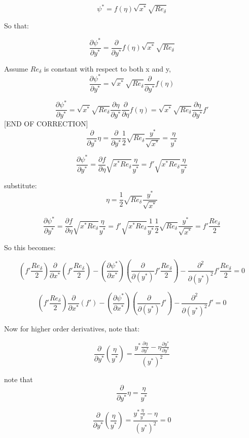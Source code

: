 \documentclass[11pt]{article}
\begin{document}
$$\psi^* = f(\eta) \sqrt{x^*} \sqrt{Re_\delta}$$

So that:

$$\frac{\partial \psi^* }{\partial y^*} =\frac{\partial}{\partial y^*} f(\eta) \sqrt{x^*} \sqrt{Re_\delta} $$

Assume $Re_\delta$ is constant with respect to both x and y,
$$\frac{\partial \psi^* }{\partial y^*} = \sqrt{x^*} \sqrt{Re_\delta} \frac{\partial}{\partial y^*} f(\eta)  $$


$$\frac{\partial \psi^* }{\partial y^*} = \sqrt{x^*} \sqrt{Re_\delta} \frac{\partial \eta}{\partial y^*} \frac{\partial}{\partial \eta} f(\eta) = \sqrt{x^*} \sqrt{Re_\delta} \frac{\partial \eta}{\partial y^*} f' $$
[END OF CORRECTION]
$$\frac{\partial}{\partial y^*} \eta =  \frac{\partial}{\partial y^*} \frac{1}{2} \sqrt{Re_\delta} \frac{y^*}{\sqrt{x^*}} = \frac{\eta}{y^*}$$

$$ \frac{\partial \psi^* }{\partial y^*} = \frac{\partial f}{\partial \eta} \sqrt{x^* Re_\delta}  \frac{\eta}{y^*} = f' \sqrt{x^* Re_\delta}  \frac{\eta}{y^*}$$


substitute:
$$\eta = \frac{1}{2} \sqrt{Re_\delta} \frac{y^*}{\sqrt{x^*}}  $$

$$ \frac{\partial \psi^* }{\partial y^*} = \frac{\partial f}{\partial \eta} \sqrt{x^* Re_\delta}  \frac{\eta}{y^*} = f' \sqrt{x^* Re_\delta}  \frac{1}{y^*} \frac{1}{2} \sqrt{Re_\delta} \frac{y^*}{\sqrt{x^*}} = f' \frac{Re_\delta}{2}$$

So this becomes:

$$  (f' \frac{Re_\delta}{2})  \frac{\partial}{\partial x^* } (f' \frac{Re_\delta}{2}) - (\frac{\partial \psi^*}{\partial x^*})  (\frac{\partial }{\partial (y^*)} f' \frac{Re_\delta}{2}) - \frac{\partial^2}{\partial (y^*)^2} f' \frac{Re_\delta}{2}  =  0$$

$$  (f' \frac{Re_\delta}{2})  \frac{\partial}{\partial x^* } (f' ) - (\frac{\partial \psi^*}{\partial x^*})  (\frac{\partial }{\partial (y^*)} f' ) - \frac{\partial^2}{\partial (y^*)^2} f'  =  0$$



Now for higher order derivatives, note that:

$$\frac{\partial}{\partial y^*} (\frac{\eta}{y^*}) = \frac{y^* \frac{\partial \eta}{\partial y^*} - \eta \frac{\partial y^*}{\partial y^*}}{(y^*)^2}$$


note that
$$\frac{\partial}{\partial y^*} \eta =  \frac{\eta}{y^*}$$

$$\frac{\partial}{\partial y^*} (\frac{\eta}{y^*}) = \frac{y^* \frac{\eta}{y^*} - \eta }{(y^*)^2} = 0$$
\end{document}
